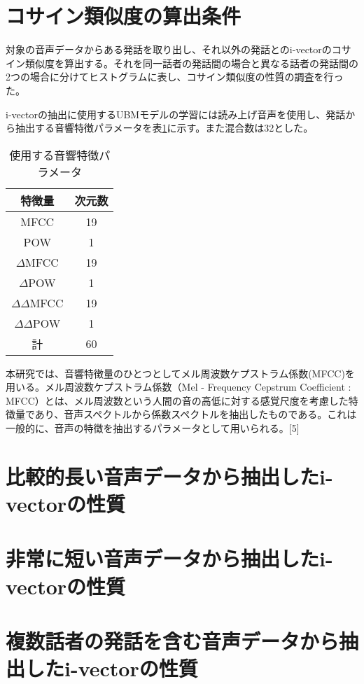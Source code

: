 \section{コサイン類似度の算出条件}
対象の音声データからある発話を取り出し、それ以外の発話とのi-vectorのコサイン類似度を算出する。それを同一話者の発話間の場合と異なる話者の発話間の2つの場合に分けてヒストグラムに表し、コサイン類似度の性質の調査を行った。\par
i-vectorの抽出に使用するUBMモデルの学習には読み上げ音声\cite{ATR}を使用し、発話から抽出する音響特徴パラメータを表\ref{iv_feature}に示す。また混合数は32とした。

\begin{table}[htb]
  \begin{center}
    \caption{使用する音響特徴パラメータ}
    \label{iv_feature}
    \begin{tabular}{|c||c|} \hline
      特徴量 & 次元数\\ \hline
      MFCC & 19  \\ \hline
      POW & 1  \\ \hline
      $\Delta$MFCC & 19 \\ \hline
      $\Delta$POW & 1 \\ \hline
      $\Delta\Delta$MFCC & 19 \\ \hline
      $\Delta\Delta$POW & 1 \\ \hline
      計 & 60 \\ \hline
    \end{tabular}
  \end{center}
\end{table}

本研究では、音響特徴量のひとつとしてメル周波数ケプストラム係数(MFCC)を用いる。メル周波数ケプストラム係数（Mel - Frequency Cepstrum Coefficient : MFCC）とは、メル周波数という人間の音の高低に対する感覚尺度を考慮した特徴量であり、音声スペクトルから係数スペクトルを抽出したものである。これは一般的に、音声の特徴を抽出するパラメータとして用いられる。[5]

\section{比較的長い音声データから抽出したi-vectorの性質}
\section{非常に短い音声データから抽出したi-vectorの性質}
\section{複数話者の発話を含む音声データから抽出したi-vectorの性質}
